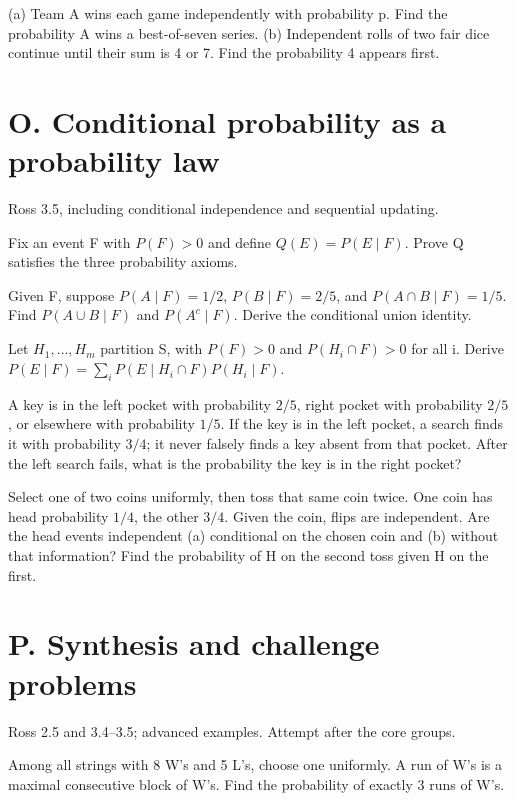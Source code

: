 \documentclass[11pt]{article}
\newcommand{\qid}[1]{\par\needspace{5\baselineskip}\noindent{\color{accent}\bfseries #1}\quad}
\newcommand{\source}[1]{{\small\color{muted}#1}\par}
\begin{document}
\qid{N5} (a) Team A wins each game independently with probability p. Find the probability A wins a best-of-seven series. (b) Independent rolls of two fair dice continue until their sum is 4 or 7. Find the probability 4 appears first.
\par\vspace{0.40in}


\clearpage
\section*{O. Conditional probability as a probability law}
\source{Ross 3.5, including conditional independence and sequential updating.}
\qid{O1} Fix an event F with \(P(F)>0\) and define \(Q(E)=P(E\mid F)\). Prove Q satisfies the three probability axioms.
\par\vspace{0.40in}

\qid{O2} Given F, suppose \(P(A\mid F)=1/2\), \(P(B\mid F)=2/5\), and \(P(A\cap B\mid F)=1/5\). Find \(P(A\cup B\mid F)\) and \(P(A^c\mid F)\). Derive the conditional union identity.
\par\vspace{0.40in}

\qid{O3} Let \(H_1,\ldots,H_m\) partition S, with \(P(F)>0\) and \(P(H_i\cap F)>0\) for all i. Derive \(P(E\mid F)=\sum_i P(E\mid H_i\cap F)P(H_i\mid F)\).
\par\vspace{0.40in}

\qid{O4} A key is in the left pocket with probability \(2/5\), right pocket with probability \(2/5\), or elsewhere with probability \(1/5\). If the key is in the left pocket, a search finds it with probability \(3/4\); it never falsely finds a key absent from that pocket. After the left search fails, what is the probability the key is in the right pocket?
\par\vspace{0.40in}

\qid{O5} Select one of two coins uniformly, then toss that same coin twice. One coin has head probability \(1/4\), the other \(3/4\). Given the coin, flips are independent. Are the head events independent (a) conditional on the chosen coin and (b) without that information? Find the probability of H on the second toss given H on the first.
\par\vspace{0.40in}


\clearpage
\section*{P. Synthesis and challenge problems}
\source{Ross 2.5 and 3.4--3.5; advanced examples. Attempt after the core groups.}
\qid{P1} Among all strings with 8 W's and 5 L's, choose one uniformly. A run of W's is a maximal consecutive block of W's. Find the probability of exactly 3 runs of W's.
\par\vspace{0.40in}
\end{document}
